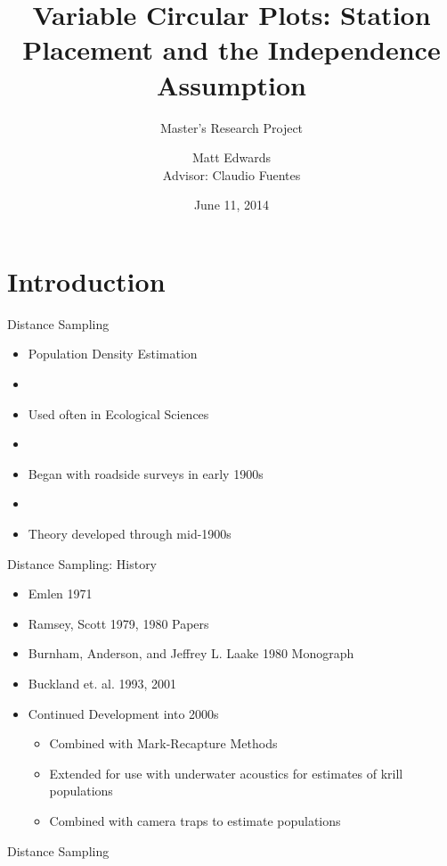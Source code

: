 \documentclass{beamer}
\title{Variable Circular Plots: Station Placement and the Independence Assumption}
\subtitle{Master's Research Project}
\author{Matt Edwards\\ Advisor: Claudio Fuentes}
\date{June 11, 2014}
\begin{document}
\begin{frame}
	\titlepage
\end{frame}


\section{Introduction}

\begin{frame}{Distance Sampling}
\begin{itemize}
\item Population Density Estimation
\item[]
\item Used often in Ecological Sciences
\item[]
\item Began with roadside surveys in early 1900s
\item[]
\item Theory developed through mid-1900s

\end{itemize}
\end{frame}

\begin{frame}{Distance Sampling: History}
\begin{itemize}
\item Emlen 1971
\item Ramsey, Scott 1979, 1980 Papers
\item Burnham, Anderson, and Jeffrey L. Laake 1980 Monograph
\item Buckland et. al. 1993, 2001
\item Continued Development into 2000s
\begin{itemize}
\item Combined with Mark-Recapture Methods
\item Extended for use with underwater acoustics for estimates of krill populations 
\item Combined with camera traps to estimate populations
\end{itemize}
\end{itemize}
\end{frame}

\begin{frame}{Distance Sampling}

\end{frame}
\end{document}
